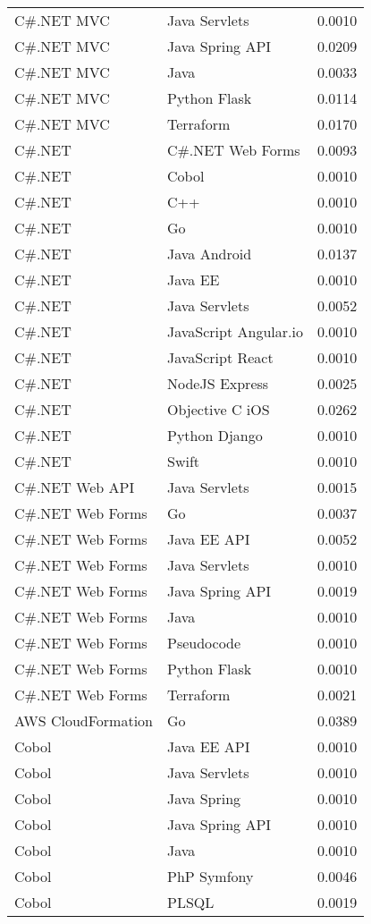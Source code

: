 {\begin{longtable}{lll}
C\#.NET MVC & Java Servlets & 0.0010\\
C\#.NET MVC & Java Spring API & 0.0209\\
C\#.NET MVC & Java & 0.0033\\
C\#.NET MVC & Python Flask & 0.0114\\
C\#.NET MVC & Terraform & 0.0170\\
C\#.NET & C\#.NET Web Forms & 0.0093\\
C\#.NET & Cobol & 0.0010\\
C\#.NET & C++ & 0.0010\\
C\#.NET & Go & 0.0010\\
C\#.NET & Java Android & 0.0137\\
C\#.NET & Java EE & 0.0010\\
C\#.NET & Java Servlets & 0.0052\\
C\#.NET & JavaScript Angular.io & 0.0010\\
C\#.NET & JavaScript React & 0.0010\\
C\#.NET & NodeJS Express & 0.0025\\
C\#.NET & Objective C iOS & 0.0262\\
C\#.NET & Python Django & 0.0010\\
C\#.NET & Swift & 0.0010\\
C\#.NET Web API & Java Servlets & 0.0015\\
C\#.NET Web Forms & Go & 0.0037\\
C\#.NET Web Forms & Java EE API & 0.0052\\
C\#.NET Web Forms & Java Servlets & 0.0010\\
C\#.NET Web Forms & Java Spring API & 0.0019\\
C\#.NET Web Forms & Java & 0.0010\\
C\#.NET Web Forms & Pseudocode & 0.0010\\
C\#.NET Web Forms & Python Flask & 0.0010\\
C\#.NET Web Forms & Terraform & 0.0021\\
AWS CloudFormation & Go & 0.0389\\
Cobol & Java EE API & 0.0010\\
Cobol & Java Servlets & 0.0010\\
Cobol & Java Spring & 0.0010\\
Cobol & Java Spring API & 0.0010\\
Cobol & Java & 0.0010\\
Cobol & PhP Symfony & 0.0046\\
Cobol & PLSQL & 0.0019\\

\end{longtable}}

